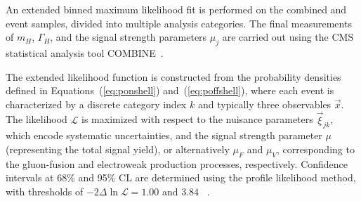 

An extended binned maximum likelihood fit is performed on the combined \onshell and \offshell event samples, divided into multiple analysis categories. The final measurements of $m_H$, $\Gamma_H$, and the signal strength parameters $\mu_{j}$ are carried out using the CMS statistical analysis tool COMBINE~\cite{CMS:2024onh}.

The extended likelihood function is constructed from the probability densities defined in Equations~(\ref{eq:ponshell}) and~(\ref{eq:poffshell}), where each event is characterized by a discrete category index $k$ and typically three observables $\vec{x}$. The likelihood $\mathcal{L}$ is maximized with respect to the nuisance parameters $\vec{\xi}_{jk}$, which encode systematic uncertainties, and the signal strength parameter $\mu$ (representing the total signal yield), or alternatively $\mu_F$ and $\mu_V$, corresponding to the gluon-fusion and electroweak production processes, respectively. Confidence intervals at 68\% and 95\% CL are determined using the profile likelihood method, with thresholds of $-2\Delta\ln\mathcal{L} = 1.00$ and $3.84$ ~\cite{Wilks:1938dza}.

